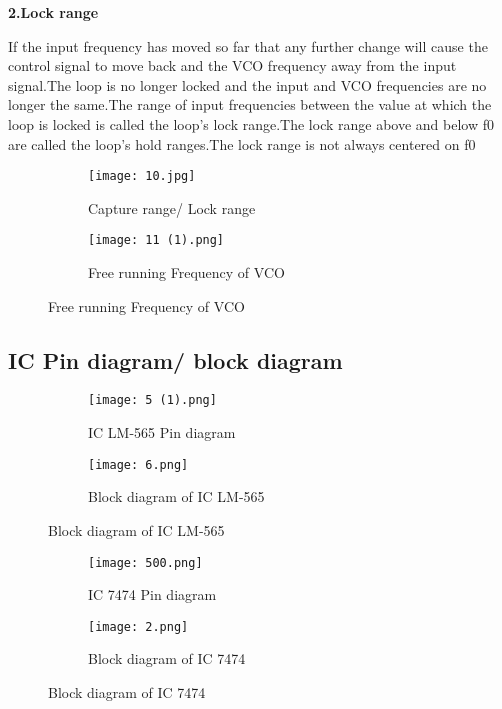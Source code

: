 \documentclass{article}
\begin{document}
\textbf{2.Lock range} \par
If the input frequency has moved so far that any further change will cause the control signal to move back and the VCO frequency away from the input signal.The loop is no longer locked and the input and VCO frequencies are no longer the same.The range of input frequencies between the value at which the loop is locked is called the loop’s lock range.The lock range above and below f0 are called the loop’s hold ranges.The lock range is not always centered on f0

\begin{figure}[h]
  \begin{subfigure}[b]{0.6\textwidth}
    \texttt{[image: 10.jpg]}
    \caption{Capture range/ Lock range}
    \label{fig:1}
  \end{subfigure}
  \begin{subfigure}[b]{0.45\textwidth}
    \texttt{[image: 11 (1).png]}
    \caption{Free running Frequency of VCO }
    \label{fig:2}
  \end{subfigure}
\end{figure}




\subsection{IC Pin diagram/ block diagram}
\begin{figure}[ht]
  \begin{subfigure}[b]{0.4\textwidth}
    \texttt{[image: 5 (1).png]}
    \caption{ IC LM-565 Pin diagram}
    \label{fig:1}
  \end{subfigure}
  \begin{subfigure}[b]{0.4\textwidth}
    \texttt{[image: 6.png]}
    \caption{Block diagram of IC LM-565}
    \label{fig:2}
  \end{subfigure}
\end{figure}
\begin{figure}[ht]
  \begin{subfigure}[b]{0.3\textwidth}
    \texttt{[image: 500.png]}
    \caption{ IC 7474 Pin diagram}
    \label{fig:1}
  \end{subfigure}
  \begin{subfigure}[b]{0.3\textwidth}
    \texttt{[image: 2.png]}
    \caption{Block diagram of IC 7474}
    \label{fig:2}
  \end{subfigure}
\end{figure}
\end{document}
